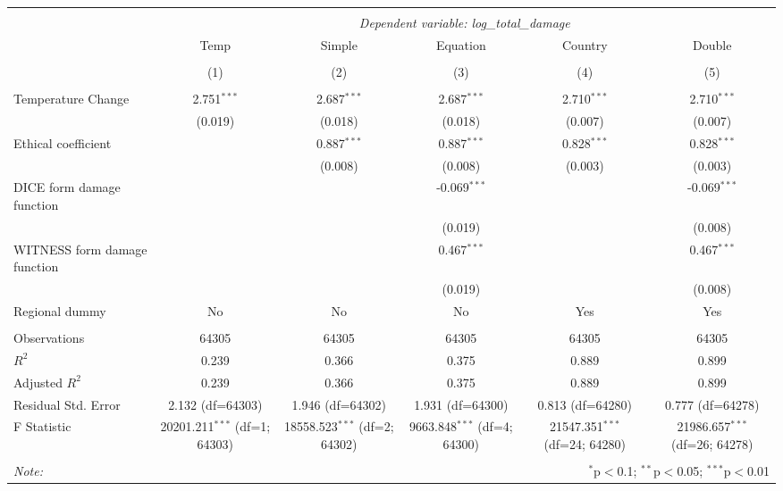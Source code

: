 \begin{table}[!htbp] \centering
\begin{tabular}{@{\extracolsep{5pt}}lccccc}
\\[-1.8ex]\hline
\hline \\[-1.8ex]
& \multicolumn{5}{c}{\textit{Dependent variable: log\_total\_damage}} \
\cr \cline{2-6}
\\[-1.8ex] & \multicolumn{1}{c}{Temp} & \multicolumn{1}{c}{Simple} & \multicolumn{1}{c}{Equation} & \multicolumn{1}{c}{Country} & \multicolumn{1}{c}{Double}  \\
\\[-1.8ex] & (1) & (2) & (3) & (4) & (5) \\
\hline \\[-1.8ex]
 Temperature Change & 2.751$^{***}$ & 2.687$^{***}$ & 2.687$^{***}$ & 2.710$^{***}$ & 2.710$^{***}$ \\
& (0.019) & (0.018) & (0.018) & (0.007) & (0.007) \\[2em]
 Ethical coefficient & & 0.887$^{***}$ & 0.887$^{***}$ & 0.828$^{***}$ & 0.828$^{***}$ \\
& & (0.008) & (0.008) & (0.003) & (0.003) \\[2em]
 DICE form damage function & & & -0.069$^{***}$ & & -0.069$^{***}$ \\
& & & (0.019) & & (0.008) \\[2em]
 WITNESS form damage function & & & 0.467$^{***}$ & & 0.467$^{***}$ \\
& & & (0.019) & & (0.008) \\[2em]
 Regional dummy & No & No & No & Yes & Yes \\
\hline \\[-1.8ex]
 Observations & 64305 & 64305 & 64305 & 64305 & 64305 \\
 $R^2$ & 0.239 & 0.366 & 0.375 & 0.889 & 0.899 \\
 Adjusted $R^2$ & 0.239 & 0.366 & 0.375 & 0.889 & 0.899 \\
 Residual Std. Error & 2.132 (df=64303) & 1.946 (df=64302) & 1.931 (df=64300) & 0.813 (df=64280) & 0.777 (df=64278) \\
 F Statistic & 20201.211$^{***}$ (df=1; 64303) & 18558.523$^{***}$ (df=2; 64302) & 9663.848$^{***}$ (df=4; 64300) & 21547.351$^{***}$ (df=24; 64280) & 21986.657$^{***}$ (df=26; 64278) \\
\hline
\hline \\[-1.8ex]
\textit{Note:} & \multicolumn{5}{r}{$^{*}$p$<$0.1; $^{**}$p$<$0.05; $^{***}$p$<$0.01} \\
\end{tabular}
\end{table}
